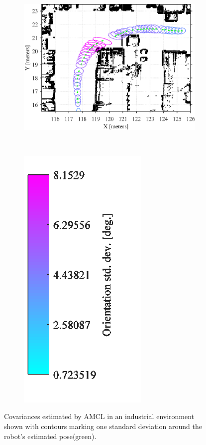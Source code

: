 \begin{figure}[tbph]
	\centering
	\begin{subfigure}[t]{0.75\textwidth}
		\includegraphics[scale=1.0]{figures/static_mapping/amcl_covariance}		
		\label{fig:amcl_covariance}
	\end{subfigure}
	~ %
	\begin{subfigure}[t]{0.2\textwidth}
		\includegraphics[scale=1.0]{figures/static_mapping/amcl_covariance_bar}
		\label{fig:amcl_covariance_bar}
	\end{subfigure}
	\caption{Covariances estimated by AMCL in an industrial environment shown with contours marking one standard deviation around the robot's estimated pose(green).}
\end{figure}

